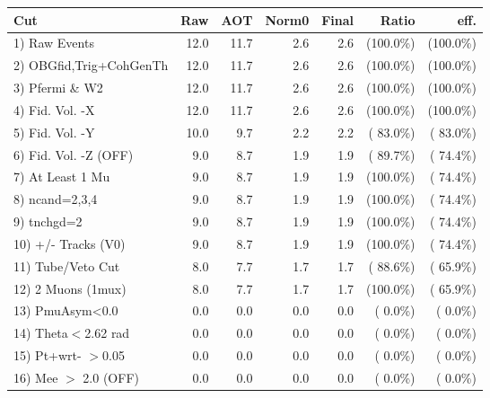  \begin{table}[h!]\centering
 \begin{tabular}{||l||r|r|r|r|r|r||}
 \hline
 \hline
 Cut & Raw & AOT & Norm0 & Final & Ratio & eff.       \\
 \hline
  1) Raw Events           &         12.0 &         11.7 &          2.6 &          2.6 & (100.0\%) & (100.0\%) \\
  2) OBGfid,Trig+CohGenTh &         12.0 &         11.7 &          2.6 &          2.6 & (100.0\%) & (100.0\%) \\
  3) Pfermi \& W2         &         12.0 &         11.7 &          2.6 &          2.6 & (100.0\%) & (100.0\%) \\
  4) Fid. Vol. -X         &         12.0 &         11.7 &          2.6 &          2.6 & (100.0\%) & (100.0\%) \\
  5) Fid. Vol. -Y         &         10.0 &          9.7 &          2.2 &          2.2 & ( 83.0\%) & ( 83.0\%) \\
  6) Fid. Vol. -Z (OFF)   &          9.0 &          8.7 &          1.9 &          1.9 & ( 89.7\%) & ( 74.4\%) \\
  7) At Least 1 Mu        &          9.0 &          8.7 &          1.9 &          1.9 & (100.0\%) & ( 74.4\%) \\
  8) ncand=2,3,4          &          9.0 &          8.7 &          1.9 &          1.9 & (100.0\%) & ( 74.4\%) \\
  9) tnchgd=2             &          9.0 &          8.7 &          1.9 &          1.9 & (100.0\%) & ( 74.4\%) \\
 10) +/- Tracks (V0)      &          9.0 &          8.7 &          1.9 &          1.9 & (100.0\%) & ( 74.4\%) \\
 11) Tube/Veto Cut        &          8.0 &          7.7 &          1.7 &          1.7 & ( 88.6\%) & ( 65.9\%) \\
 12) 2 Muons (1mux)       &          8.0 &          7.7 &          1.7 &          1.7 & (100.0\%) & ( 65.9\%) \\
 13) PmuAsym<0.0          &          0.0 &          0.0 &          0.0 &          0.0 & (  0.0\%) & (  0.0\%) \\
 14) Theta$<$2.62 rad     &          0.0 &          0.0 &          0.0 &          0.0 & (  0.0\%) & (  0.0\%) \\
 15) Pt+wrt- $>$0.05      &          0.0 &          0.0 &          0.0 &          0.0 & (  0.0\%) & (  0.0\%) \\
 16) Mee $>$ 2.0  (OFF)   &          0.0 &          0.0 &          0.0 &          0.0 & (  0.0\%) & (  0.0\%) \\

\end{tabular}
\end{table}
